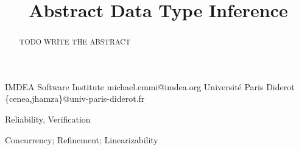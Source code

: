 \documentclass[10pt,preprint,nocopyrightspace,natbib,authoryear]{sigplanconf}
\begin{document}
\setlength{\pdfpageheight}{\paperheight}
\setlength{\pdfpagewidth}{\paperwidth}






\title{Abstract Data Type Inference}

           {IMDEA Software Institute}
           {michael.emmi@imdea.org}
           {Université Paris Diderot}
           {\{cenea,jhamza\}@univ-paris-diderot.fr}

\maketitle

\begin{abstract}

  TODO WRITE THE ABSTRACT

\end{abstract}


\terms
Reliability, Verification

\keywords
Concurrency; Refinement; Linearizability















%
%
%
\end{document}
